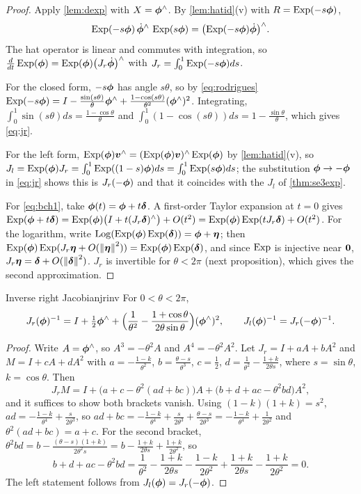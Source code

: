 \begin{proof}
Apply \cref{lem:dexp} with $X=\bm{\phi}^{\wedge}$. By \cref{lem:hatid}(v)
with $R=\operatorname{Exp}(-s\bm{\phi})$,
\[
\operatorname{Exp}(-s\bm{\phi})\,\dot{\bm{\phi}}^{\wedge}\,\operatorname{Exp}(s\bm{\phi})=
\bigl(\operatorname{Exp}(-s\bm{\phi})\dot{\bm{\phi}}\bigr)^{\wedge}.
\]
The hat operator is linear and commutes with integration, so
$\frac{d}{dt}\operatorname{Exp}(\bm{\phi})=\operatorname{Exp}(\bm{\phi})\bigl(J_r\dot{\bm{\phi}}\bigr)^{\wedge}$
with $J_r=\int_0^1\operatorname{Exp}(-s\bm{\phi})ds$.

For the closed form, $-s\bm{\phi}$ has angle $s\theta$, so by
\eqref{eq:rodrigues}
$\operatorname{Exp}(-s\bm{\phi})=I-\frac{\sin(s\theta)}{\theta}\bm{\phi}^{\wedge}+
\frac{1-\cos(s\theta)}{\theta^2}(\bm{\phi}^{\wedge})^2$. Integrating,
$\int_0^1\sin(s\theta)ds=\frac{1-\cos\theta}{\theta}$ and
$\int_0^1(1-\cos(s\theta))ds=1-\frac{\sin\theta}{\theta}$, which gives
\eqref{eq:jr}.

For the left form, $\operatorname{Exp}(\bm{\phi})\bm{v}^{\wedge}=(\operatorname{Exp}(\bm{\phi})
\bm{v})^{\wedge}\operatorname{Exp}(\bm{\phi})$ by \cref{lem:hatid}(v), so $J_l=\operatorname{Exp}(\bm{\phi})J_r=
\int_0^1\operatorname{Exp}((1-s)\bm{\phi})ds=\int_0^1\operatorname{Exp}(s\bm{\phi})ds$; the substitution
$\bm{\phi}\to-\bm{\phi}$ in \eqref{eq:jr} shows this is $J_r(-\bm{\phi})$ and that it
coincides with the $J_l$ of \cref{thm:se3exp}.

For \eqref{eq:bch1}, take $\bm{\phi}(t)=\bm{\phi}+t\bm{\delta}$. A first-order
Taylor expansion at $t=0$ gives $\operatorname{Exp}(\bm{\phi}+t\bm{\delta})=\operatorname{Exp}(\bm{\phi})
\bigl(I+t(J_r\bm{\delta})^{\wedge}\bigr)+O(t^2)=\operatorname{Exp}(\bm{\phi})\operatorname{Exp}(tJ_r
\bm{\delta})+O(t^2)$. For the logarithm, write $\operatorname{Log}(\operatorname{Exp}(\bm{\phi})
\operatorname{Exp}(\bm{\delta}))=\bm{\phi}+\bm{\eta}$; then $\operatorname{Exp}(\bm{\phi})\operatorname{Exp}(J_r\bm{\eta}
+O(\left\lVert \bm{\eta}\right\rVert^2))=\operatorname{Exp}(\bm{\phi})\operatorname{Exp}(\bm{\delta})$, and since $\operatorname{Exp}$
is injective near $\bm{0}$, $J_r\bm{\eta}=\bm{\delta}+O(\left\lVert \bm{\delta}\right\rVert^2)$. $J_r$ is invertible for $\theta<2\pi$ (next proposition),
which gives the second approximation.
\end{proof}

\begin{proposition}{Inverse right Jacobian}{jrinv}
For $0<\theta<2\pi$,
\[
J_r(\bm{\phi})^{-1}=I+\tfrac12\bm{\phi}^{\wedge}+\Bigl(\frac1{\theta^2}-
\frac{1+\cos\theta}{2\theta\sin\theta}\Bigr)(\bm{\phi}^{\wedge})^2,
\qquad J_l(\bm{\phi})^{-1}=J_r(-\bm{\phi})^{-1}.
\]
\end{proposition}

\begin{proof}
Write $A=\bm{\phi}^{\wedge}$, so $A^3=-\theta^2A$ and $A^4=-\theta^2A^2$.
Let $J_r=I+aA+bA^2$ and $M=I+cA+dA^2$ with $a=-\frac{1-k}{\theta^2}$,
$b=\frac{\theta-s}{\theta^3}$, $c=\frac12$,
$d=\frac1{\theta^2}-\frac{1+k}{2\theta s}$, where $s=\sin\theta$,
$k=\cos\theta$. Then
\[
J_rM=I+\bigl(a+c-\theta^2(ad+bc)\bigr)A+\bigl(b+d+ac-\theta^2bd\bigr)A^2,
\]
and it suffices to show both brackets vanish. Using $(1-k)(1+k)=s^2$,
$ad=-\frac{1-k}{\theta^4}+\frac{s}{2\theta^3}$, so
$ad+bc=-\frac{1-k}{\theta^4}+\frac{s}{2\theta^3}+\frac{\theta-s}{2
\theta^3}=-\frac{1-k}{\theta^4}+\frac1{2\theta^2}$ and
$\theta^2(ad+bc)=a+c$. For the second bracket,
$\theta^2bd=b-\frac{(\theta-s)(1+k)}{2\theta^2s}=b-\frac{1+k}{2\theta s}
+\frac{1+k}{2\theta^2}$, so
\[
b+d+ac-\theta^2bd=\frac1{\theta^2}-\frac{1+k}{2\theta s}-
\frac{1-k}{2\theta^2}+\frac{1+k}{2\theta s}-\frac{1+k}{2\theta^2}=0.
\]
The left statement follows from $J_l(\bm{\phi})=J_r(-\bm{\phi})$.
\end{proof}

